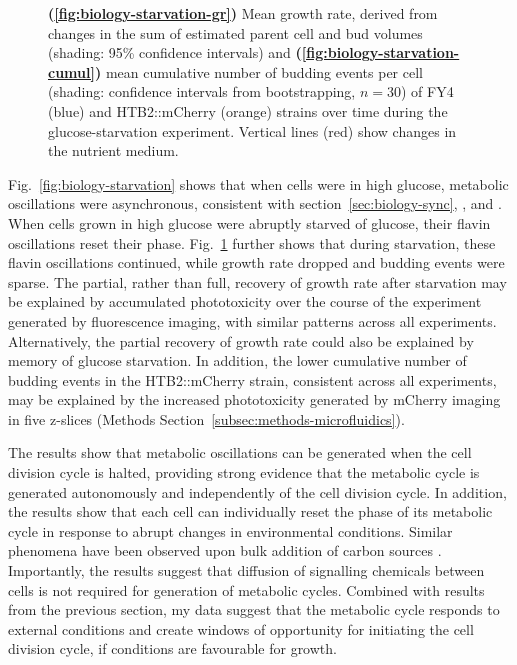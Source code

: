 \begin{figure}
  \caption[
    Mean growth rate, derived from changes in the sum of estimated parent cell and bud volumes and
    mean cumulative number of budding events per cell
    of FY4 and HTB2::mCherry strains over time during the glucose-starvation experiment.
  ]{
    \textbf{(\ref{fig:biology-starvation-gr})}
    Mean growth rate, derived from changes in the sum of estimated parent cell and bud volumes (shading: 95\% confidence intervals) and
    \textbf{(\ref{fig:biology-starvation-cumul})}
    mean cumulative number of budding events per cell (shading: confidence intervals from bootstrapping, $n=30$)
    of FY4 (blue) and HTB2::mCherry (orange) strains over time during the glucose-starvation experiment.
    Vertical lines (red) show changes in the nutrient medium.
  }
  \label{fig:biology-starvation-gr-budprob}
\end{figure}

Fig.\ \ref{fig:biology-starvation} shows that when cells were in high glucose, metabolic oscillations were asynchronous, consistent with section~\ref{sec:biology-sync}, \textcite{papagiannakisAutonomousMetabolicOscillations2017}, and \textcite{baumgartnerFlavinbasedMetabolicCycles2018}.
When cells grown in high glucose were abruptly starved of glucose, their flavin oscillations reset their phase.
Fig.\ \ref{fig:biology-starvation-gr-budprob} further shows that during starvation, these flavin oscillations continued, while growth rate dropped and budding events were sparse.
The partial, rather than full, recovery of growth rate after starvation may be explained by accumulated phototoxicity over the course of the experiment generated by fluorescence imaging, with similar patterns across all experiments.
Alternatively, the partial recovery of growth rate could also be explained by memory of glucose starvation.
In addition, the lower cumulative number of budding events in the HTB2::mCherry strain, consistent across all experiments, may be explained by the increased phototoxicity generated by mCherry imaging in five z-slices (Methods Section~\ref{subsec:methods-microfluidics}).


The results show that metabolic oscillations can be generated when the cell division cycle is halted, providing strong evidence that the metabolic cycle is generated autonomously and independently of the cell division cycle.
In addition, the results show that each cell can individually reset the phase of its metabolic cycle in response to abrupt changes in environmental conditions.
Similar phenomena have been observed upon bulk addition of carbon sources \parencite{kuangMsn2RegulateExpression2017, krishnaMinimalPushPull2018}.
Importantly, the results suggest that diffusion of signalling chemicals between cells is not required for generation of metabolic cycles.
Combined with results from the previous section, my data suggest that the metabolic cycle responds to external conditions and create windows of opportunity for initiating the cell division cycle, if conditions are favourable for growth.



